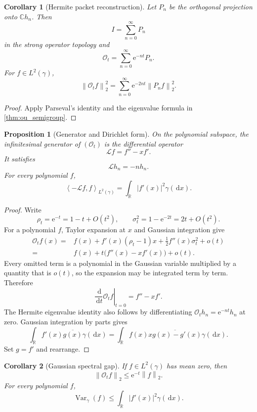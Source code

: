 \documentclass{aomart}
\newtheorem{proposition}[proposition]{Proposition}
\newtheorem{corollary}[corollary]{Corollary}
\theoremstyle{definition}
\theoremstyle{remark}
\newcommand{\CC}{\mathbb C}
\newcommand{\RR}{\mathbb R}
\newcommand{\Lcal}{\mathcal L}
\newcommand{\Ocal}{\mathcal O}
\newcommand{\Var}{\operatorname{Var}}
\newcommand{\e}{\mathrm e}
\newcommand{\dd}{\,\mathrm d}
\newcommand{\norm}[1]{\left\lVert#1\right\rVert}
\newcommand{\abs}[1]{\left\lvert#1\right\rvert}
\newcommand{\ip}[2]{\left\langle#1,#2\right\rangle}
\begin{document}
\begin{corollary}[Hermite packet reconstruction]\label{cor:hermite_packets}
Let \(P_n\) be the orthogonal projection onto \(\CC h_n\). Then
\[
I=\sum_{n=0}^\infty P_n
\]
in the strong operator topology and
\[
\Ocal_t
=
\sum_{n=0}^\infty\e^{-nt}P_n.
\]
For \(f\in L^2(\gamma)\),
\[
\norm{\Ocal_t f}_2^2
=
\sum_{n=0}^\infty
\e^{-2nt}\norm{P_nf}_2^2.
\]
\end{corollary}

\begin{proof}
Apply Parseval's identity and the eigenvalue formula in \cref{thm:ou_semigroup}.
\end{proof}

\begin{proposition}[Generator and Dirichlet form]\label{prop:ou_generator}
On the polynomial subspace, the infinitesimal generator of \((\Ocal_t)\) is the differential operator
\[
\Lcal f=f''-xf'.
\]
It satisfies
\[
\Lcal h_n=-nh_n.
\]
For every polynomial \(f\),
\[
\ip{-\Lcal f}{f}_{L^2(\gamma)}
=
\int_\RR\abs{f'(x)}^2\gamma(\dd x).
\]
\end{proposition}

\begin{proof}
Write
\[
\rho_t=\e^{-t}=1-t+O(t^2),
\qquad
\sigma_t^2=1-\e^{-2t}=2t+O(t^2).
\]
For a polynomial \(f\), Taylor expansion at \(x\) and Gaussian integration give
\[
\begin{aligned}
\Ocal_tf(x)
={}&f(x)
+f'(x)(\rho_t-1)x
+\frac12f''(x)\sigma_t^2
+o(t)\\
={}&f(x)+t\bigl(f''(x)-xf'(x)\bigr)+o(t).
\end{aligned}
\]
Every omitted term is a polynomial in the Gaussian variable multiplied by a quantity that is \(o(t)\), so the expansion may be integrated term by term. Therefore
\[
\left.\frac{\dd}{\dd t}\Ocal_tf\right|_{t=0}
=f''-xf'.
\]
The Hermite eigenvalue identity also follows by differentiating
\(
\Ocal_th_n=\e^{-nt}h_n
\)
at zero. Gaussian integration by parts gives
\[
\int_\RR f'(x)\overline{g(x)}\gamma(\dd x)
=
\int_\RR f(x)\overline{xg(x)-g'(x)}\gamma(\dd x).
\]
Set \(g=f'\) and rearrange.
\end{proof}

\begin{corollary}[Gaussian spectral gap]\label{cor:ou_spectral_gap}
If \(f\in L^2(\gamma)\) has mean zero, then
\[
\norm{\Ocal_tf}_2
\leq
\e^{-t}\norm f_2.
\]
For every polynomial \(f\),
\[
\Var_\gamma(f)
\leq
\int_\RR\abs{f'(x)}^2\gamma(\dd x).
\]
\end{corollary}
\end{document}
